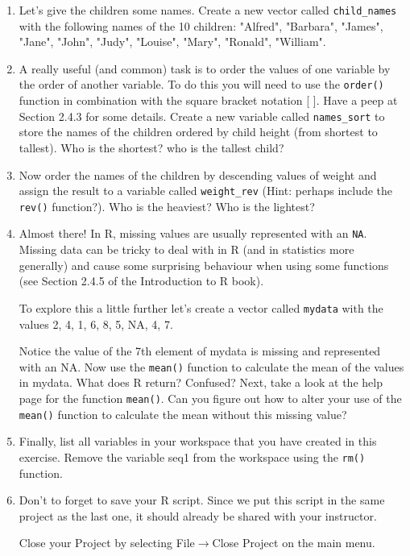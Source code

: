 \documentclass[12pt]{article}
\newcommand{\arrow}{\ensuremath{\rightarrow}}
\newcommand{\lst}[1]{\lstinline{#1}}
\begin{document}
\begin{enumerate}
 

\item Let’s give the children some names. Create a new vector called \lst{child_names} with the following names of the 10 children: "Alfred", "Barbara", "James", "Jane", "John", "Judy", "Louise", "Mary", "Ronald", "William".

 

\item A really useful (and common) task is to order the values of one variable by the order of another variable. To do this you will need to use the \lst{order()} function in combination with the square bracket notation [ ]. Have a peep at Section 2.4.3 for some details. Create a new variable called \lst{names_sort} to store the names of the children ordered by child height (from shortest to tallest). Who is the shortest? who is the tallest child?


\item Now order the names of the children by descending values of weight and assign the result to a variable called \lst{weight_rev} (Hint: perhaps include the \lst{rev()} function?). Who is the heaviest? Who is the lightest?

 

\item Almost there! In R, missing values are usually represented with an \lst{NA}. Missing data can be tricky to deal with in R (and in statistics more generally) and cause some surprising behaviour when using some functions (see Section 2.4.5 of the Introduction to R book).

 To explore this a little further let’s create a vector called 
\lst{mydata} with the values 2, 4, 1, 6, 8, 5, NA, 4, 7. 

Notice the value of the 7th element of mydata is missing and represented with an NA. Now use the \lst{mean()} function to calculate the mean of the values in mydata. What does R return? Confused? Next, take a look at the help page for the function \lst{mean()}. 
Can you figure out how to alter your use of the \lst{mean()} function to calculate the mean without this missing value?

 

\item Finally, list all variables in your workspace that you have created in this exercise. Remove the variable seq1 from the workspace using the \lst{rm()} function.
 

\item Don’t to forget to save your R script. Since we put this script in the same project
as the last one, it should already be shared with your
instructor.

Close your Project by selecting File\arrow Close Project on the main menu.

\end{enumerate}
\end{document}
